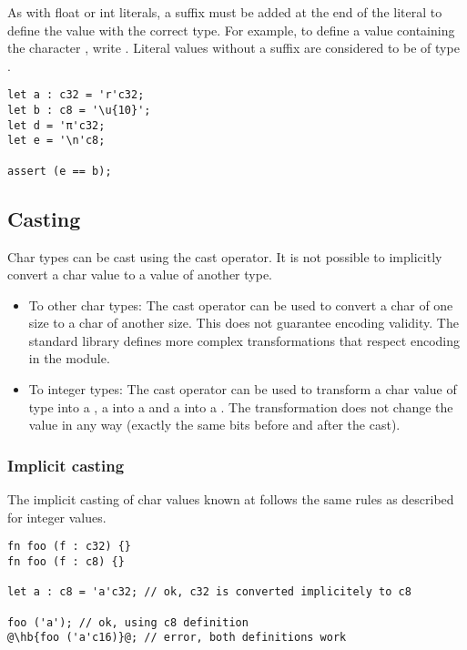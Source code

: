 As with float or int literals, a suffix must be added at the end of the literal
to define the value with the correct type. For example, to define a 
value containing the character , write . Literal values
without a suffix are considered to be of type .

\begin{lstlisting}[style=coloredverbatim]
let a : c32 = 'r'c32;
let b : c8 = '\u{10}';
let d = 'π'c32;
let e = '\n'c8;

assert (e == b);
\end{lstlisting}

\subsection{Casting}
\label{sec:org16d703f}

Char types can be cast using the cast operator. It is not possible to implicitly convert a char value to a value of another type.

\begin{itemize}
\item To other char types: The cast operator can be used to convert a char of
  one size to a char of another size. This does not guarantee encoding validity.
  The standard library defines more complex transformations that respect
  encoding in the  module.

\item To integer types: The cast operator can be used to transform a char value
  of type  into a , a  into a  and
  a  into a . The transformation does not change the
  value in any way (exactly the same bits before and after the cast).

\end{itemize}


\subsubsection{Implicit casting}

The implicit casting of char values known at  follows the same
rules as described for integer  values.

\begin{lstlisting}[style=coloredverbatim, escapechar=@]
fn foo (f : c32) {}
fn foo (f : c8) {}

let a : c8 = 'a'c32; // ok, c32 is converted implicitely to c8

foo ('a'); // ok, using c8 definition
@\hb{foo ('a'c16)}@; // error, both definitions work
\end{lstlisting}

